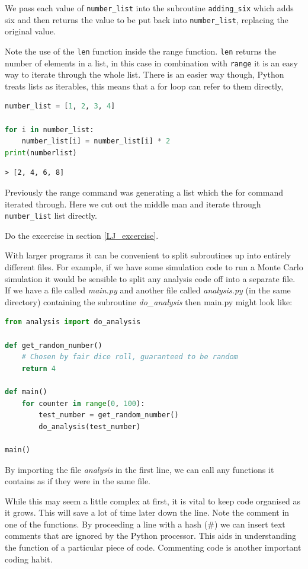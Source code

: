 			We pass each value of \texttt{number\_list} into the subroutine \texttt{adding\_six} which adds six and then returns the value to be put back into \texttt{number\_list}, replacing the original value. 

Note the use of the \texttt{len} function inside the range function. \texttt{len} returns the number of elements in a list, in this case in combination with \texttt{range} it is an easy way to iterate through the whole list. There is an easier way though, Python treats lists as iterables, this means that a for loop can refer to them directly,

			\begin{lstlisting}[language=Python]
number_list = [1, 2, 3, 4]
	
for i in number_list:
	number_list[i] = number_list[i] * 2
print(numberlist)\end{lstlisting}				

\begin{verbatim}> [2, 4, 6, 8]\end{verbatim}
Previously the range command was generating a list which the for command iterated through. Here we cut out the middle man and iterate through \texttt{number\_list} list directly.

\begin{task}Do the excercise in section \ref{LJ_excercise}.\end{task}

			With larger programs it can be convenient to split subroutines up into entirely different files. For example, if we have some simulation code to run a Monte Carlo simulation it would be sensible to split any analysis code off into a separate file. If we have a file called \textit{main.py} and another file called \textit{analysis.py} (in the same directory) containing the subroutine \textit{do\_analysis} then main.py might look like:
\begin{lstlisting}[language=Python]
from analysis import do_analysis

def get_random_number()
	# Chosen by fair dice roll, guaranteed to be random
	return 4
	
def main()
	for counter in range(0, 100):
		test_number = get_random_number()
		do_analysis(test_number)
			
main()\end{lstlisting}
By importing the file \textit{analysis} in the first line, we can call any functions it contains as if they were in the same file.

While this may seem a little complex at first, it is vital to keep code organised as it grows. This will save a lot of time later down the line. Note the comment in one of the functions. By proceeding a line with a hash (\#) we can insert text comments that are ignored by the Python processor. This aids in understanding the function of a particular piece of code. Commenting code is another important coding habit.


